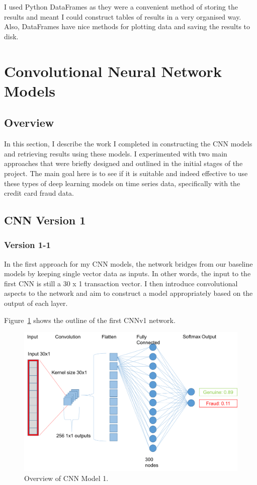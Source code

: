 \documentclass[12pt,a4paper,twoside]{report}
\begin{document}
I used Python DataFrames as they were a convenient method of storing the results and meant I could construct tables of results in a very organised way. Also, DataFrames have nice methods for plotting data and saving the results to disk. 


\section{Convolutional Neural Network Models}

\subsection{Overview}
In this section, I describe the work I completed in constructing the CNN models and retrieving results using these models. I experimented with two main approaches that were briefly designed and outlined in the initial stages of the project. The main goal here is to see if it is suitable and indeed effective to use these types of deep learning models on time series data, specifically with the credit card fraud data.


\subsection{CNN Version 1}

\subsubsection{Version 1-1}
In the first approach for my CNN models, the network bridges from our baseline models by keeping single vector data as inputs. In other words, the input to the first CNN is still a 30 x 1 transaction vector. I then introduce convolutional aspects to the network and aim to construct a model appropriately based on the output of each layer. 

Figure~\ref{fig:cnnv1} shows the outline of the first CNNv1 network.

\begin{figure}[!htbp]
\centering
\includegraphics[scale=0.6]{cnnv1}
\caption{Overview of CNN Model 1.}
\label{fig:cnnv1}
\end{figure}
\end{document}
